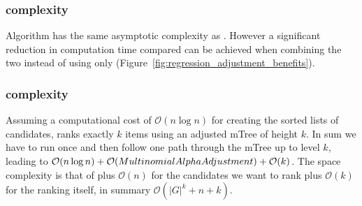 \subsubsection{\algoReg complexity}\label{subsubsec:regression-complexity}
Algorithm \algoReg has the same asymptotic complexity as \algoMultBinary.
%
However a significant reduction in computation time compared can be achieved when combining the two instead of using \algoMultBinary only (Figure~\ref{fig:regression_adjustment_benefits}).
%
\subsubsection{\algoFAIR complexity}\label{subsubsec:FAIR-complexity}
Assuming a computational cost of $\mathcal{O}(n \log{} n)$ for creating the sorted lists of candidates, \algoFAIR ranks exactly $k$ items using an adjusted mTree of height $k$.
%
In sum we have to run \algoMultBinary once and then follow one path through the mTree up to level $k$, leading to $\mathcal{O}(n \log{} n) + \mathcal{O} ({\sc MultinomialAlphaAdjustment}) + \mathcal{O}(k)$.
%
The space complexity is that of \algoMultBinary plus $\mathcal{O}(n)$ for the candidates we want to rank plus $\mathcal{O}(k)$ for the ranking itself, in summary $\mathcal{O}(|G|^k + n + k)$.
